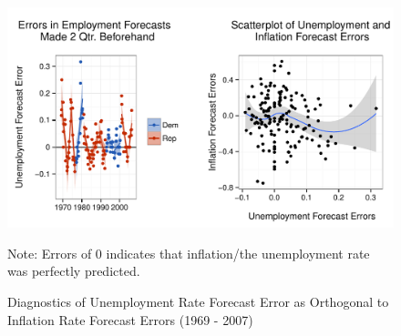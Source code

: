 \documentclass[a4paper]{article}\usepackage{graphicx, color}
\newenvironment{knitrout}{}{} %
\begin{document}
\begin{figure}[t]
    \caption{Diagnostics of Unemployment Rate Forecast Error as Orthogonal to Inflation Rate Forecast Errors (1969 - 2007)}
    \label{Unemployment}
    \begin{center}
    
\begin{knitrout}
\color{fgcolor}

{\centering \includegraphics[width=0.95\linewidth]{figure/GraphPartisanErrorUnemploy} 

}



\end{knitrout}


    \end{center}
    \begin{singlespace}
        {\scriptsize{Note: Errors of 0 indicates that inflation/the unemployment rate was perfectly predicted.}}
    \end{singlespace}
\end{figure}



\clearpage



\end{document}
